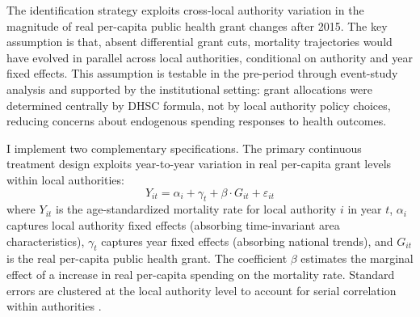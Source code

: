 \documentclass[12pt]{article}
\begin{document}
The identification strategy exploits cross-local authority variation in the magnitude of real per-capita public health grant changes after 2015. The key assumption is that, absent differential grant cuts, mortality trajectories would have evolved in parallel across local authorities, conditional on authority and year fixed effects. This assumption is testable in the pre-period through event-study analysis and supported by the institutional setting: grant allocations were determined centrally by DHSC formula, not by local authority policy choices, reducing concerns about endogenous spending responses to health outcomes.

I implement two complementary specifications. The primary continuous treatment design exploits year-to-year variation in real per-capita grant levels within local authorities:
\begin{equation}
Y_{it} = \alpha_i + \gamma_t + \beta \cdot G_{it} + \varepsilon_{it}
\label{eq:twfe}
\end{equation}
where $Y_{it}$ is the age-standardized mortality rate for local authority $i$ in year $t$, $\alpha_i$ captures local authority fixed effects (absorbing time-invariant area characteristics), $\gamma_t$ captures year fixed effects (absorbing national trends), and $G_{it}$ is the real per-capita public health grant. The coefficient $\beta$ estimates the marginal effect of a  increase in real per-capita spending on the mortality rate. Standard errors are clustered at the local authority level to account for serial correlation within authorities \citep{bertrand2004}.
\end{document}
